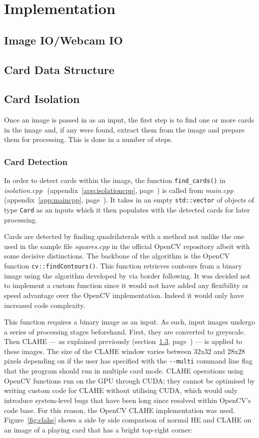 \documentclass[a4paper,12pt,notitlepage]{article}
\newcommand{\source}[2]{\emph{#1 } (appendix~\ref{#2}, page~\pageref{#2})}
\newcommand{\secref}[1]{(section~\ref{#1}, page~\pageref{#1})}
\newcommand{\code}[1]{\lstinline[basicstyle=\ttfamily,breakautoindent=false,postbreak={}]|#1|}
\begin{document}
\section{Implementation}
	\label{sec:implementation}
	\subsection{Image IO/Webcam IO}
		
	\subsection{Card Data Structure}
		
	\subsection{Card Isolation}
		\label{sec:isolation}
		Once an image is passed in as an input, the first step is to find one or more cards in the image and, if any were found, extract them from the image and prepare them for processing. This is done in a number of steps.

		\subsubsection{Card Detection}
			In order to detect cards within the image, the function \code{find_cards()} in \source{isolation.cpp}{app:isolationcpp} is called from \source{main.cpp}{app:maincpp}. It takes in an empty \code{std::vector} of objects of type \code{Card} as an inputs which it then populates with the detected cards for later processing.

			Cards are detected by finding quadrilaterals with a method not unlike the one used in the sample file \emph{squares.cpp} in the official OpenCV repository \autocite{squares} albeit with some decisive distinctions. The backbone of the algorithm is the OpenCV function \code{cv::findContours()}. This function retrieves contours from a binary image using the algorithm developed by \textcite{suzuki1985topological} via border following. It was decided not to implement a custom function since it would not have added any flexibility or speed advantage over the OpenCV implementation. Indeed it would only have increased code complexity.

			This function requires a binary image as an input. As such, input images undergo a series of processing stages beforehand. First, they are converted to greyscale. Then CLAHE --- as explained previously \secref{sec:isolation} --- is applied to these images. The size of the CLAHE window varies between 32x32 and 28x28 pixels depending on if the user has specified with the \code{--multi} command line flag that the program should run in multiple card mode. CLAHE operations using OpenCV functions run on the GPU through CUDA; they cannot be optimised by writing custom code for CLAHE without utilising CUDA, which would only introduce system-level bugs that have been long since resolved within OpenCV's code base. For this reason, the OpenCV CLAHE implementation was used. Figure~\ref{fig:clahe} shows a side by side comparison of normal HE and CLAHE on an image of a playing card that has a bright top-right corner:
\end{document}
